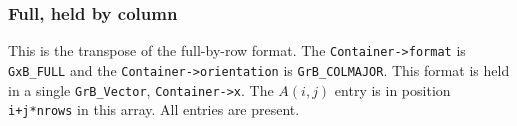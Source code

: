 \subsubsection{Full, held by column}
\label{format_full_by_col}

This is the transpose of the full-by-row format.
The \verb'Container->format' is \verb'GxB_FULL' and the
\verb'Container->orientation' is \verb'GrB_COLMAJOR'.  This format is held in a
single \verb'GrB_Vector', \verb'Container->x'.  The $A(i,j)$ entry is in
position \verb'i+j*nrows' in this array.  All entries are present.

